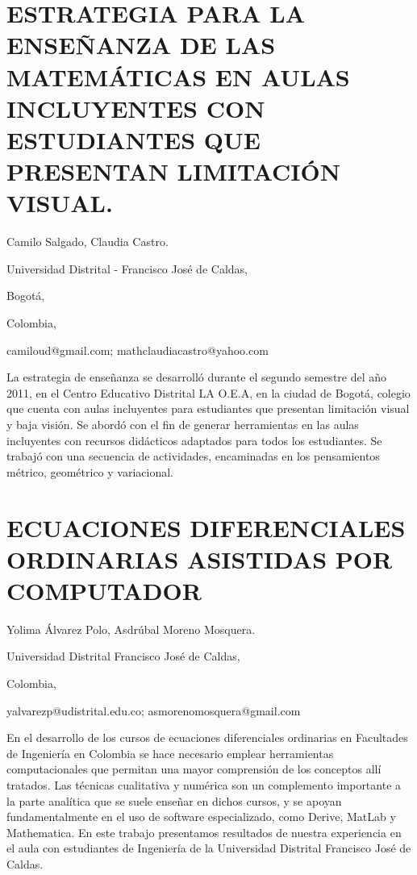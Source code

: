 \setcounter{section}{66}


\section{ESTRATEGIA PARA LA ENSEÑANZA DE LAS MATEMÁTICAS EN AULAS INCLUYENTES
CON ESTUDIANTES QUE PRESENTAN LIMITACIÓN VISUAL.}

\begin{datos}

Camilo Salgado, Claudia Castro.

Universidad Distrital - Francisco José de Caldas,

Bogotá,

Colombia,

camiloud@gmail.com; mathclaudiacastro@yahoo.com

\end{datos}

La estrategia de enseñanza se desarrolló durante el segundo semestre
del año 2011, en el Centro Educativo Distrital LA O.E.A, en la ciudad
de Bogotá, colegio que cuenta con aulas incluyentes para estudiantes
que presentan limitación visual y baja visión. Se abordó con el fin
de generar herramientas en las aulas incluyentes con recursos didácticos
adaptados para todos los estudiantes. Se trabajó con una secuencia
de actividades, encaminadas en los pensamientos métrico, geométrico
y variacional.

\setcounter{section}{69}


\section{ECUACIONES DIFERENCIALES ORDINARIAS ASISTIDAS POR COMPUTADOR }

\begin{datos}

Yolima Álvarez Polo, Asdrúbal Moreno Mosquera.

Universidad Distrital Francisco José de Caldas,

Colombia,

yalvarezp@udistrital.edu.co; asmorenomosquera@gmail.com

\end{datos}

En el desarrollo de los cursos de ecuaciones diferenciales ordinarias
en Facultades de Ingeniería en Colombia se hace necesario emplear
herramientas computacionales que permitan una mayor comprensión de
los conceptos allí tratados. Las técnicas cualitativa y numérica son
un complemento importante a la parte analítica que se suele enseñar
en dichos cursos, y se apoyan fundamentalmente en el uso de software
especializado, como Derive, MatLab y Mathematica. En este trabajo
presentamos resultados de nuestra experiencia en el aula con estudiantes
de Ingeniería de la Universidad Distrital Francisco José de Caldas. 


